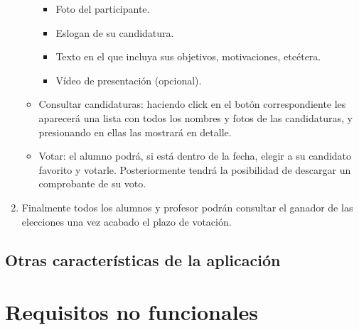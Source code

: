 \documentclass{article}
\begin{document}
\begin{enumerate}
\begin{itemize}
            \begin{itemize}
                \item Foto del participante.
                \item Eslogan de su candidatura.
                \item Texto en el que incluya sus objetivos, motivaciones, etcétera.
                \item Vídeo de presentación (opcional).
            \end{itemize}
            \item Consultar candidaturas: haciendo click en el botón correspondiente les aparecerá una lista con todos los nombres y
            fotos de las candidaturas, y presionando en ellas las mostrará en detalle.
            \item Votar: el alumno podrá, si está dentro de la fecha, elegir a su candidato favorito y votarle. Posteriormente tendrá
            la posibilidad de descargar un comprobante de su voto.
        \end{itemize}
        \item Finalmente todos los alumnos y profesor podrán consultar el ganador de las elecciones una vez acabado el plazo de votación.
    \end{enumerate}
    \subsection{Otras características de la aplicación}
\newpage

\section{Requisitos no funcionales}

\newpage
\end{document}
